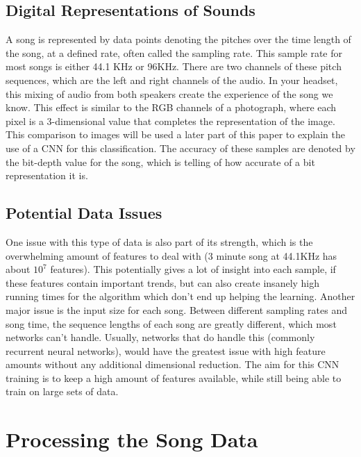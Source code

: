 \documentclass[10pt,twocolumn,letterpaper]{article}
\begin{document}
\subsection{Digital Representations of Sounds}
 A song is represented by data points denoting the pitches over the time length of the song, at a defined rate, often called the sampling rate.  This sample rate for most songs is either 44.1 KHz or 96KHz. There are two channels of these pitch sequences, which are the left and right channels of the audio. In your headset, this mixing of audio from both speakers create the experience of the song we know. This effect is similar to the RGB channels of a photograph, where each pixel is a 3-dimensional value that completes the representation of the image. This comparison to images will be used a later part of this paper to explain the use of a CNN for this classification. The accuracy of these samples are denoted by the bit-depth value for the song, which is telling of how accurate of a bit representation it is.
\subsection{Potential Data Issues}
One issue with this type of data is also part of its strength, which is the overwhelming amount of features to deal with (3 minute song at 44.1KHz has about $10^{7}$ features). This potentially gives a lot of insight into each sample, if these features contain important trends, but can also create insanely high running times for the algorithm which don't end up helping the learning. Another major issue is the input size for each song. Between different sampling rates and song time, the sequence lengths of each song are greatly different, which most networks can't handle. Usually, networks that do handle this (commonly recurrent neural networks), would have the greatest issue with high feature amounts without any additional dimensional reduction. The aim for this CNN training is to keep a high amount of features available, while still being able to train on large sets of data.
\section{Processing the Song Data}
\end{document}
